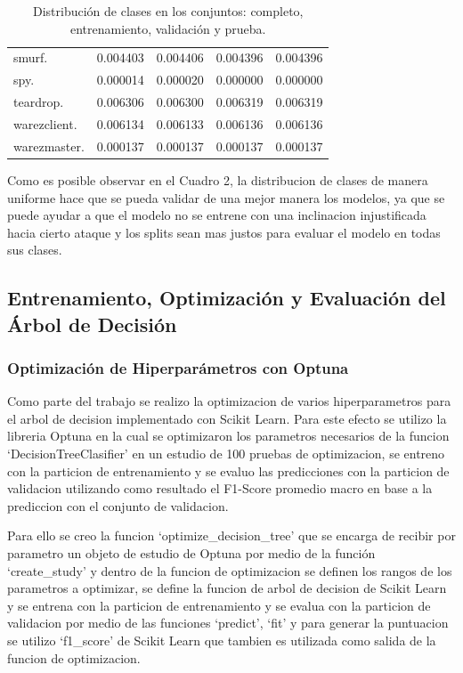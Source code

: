 \documentclass[12pt,a4paper]{article}
\begin{document}
\begin{table}[h!]
{\begin{tabular}{lrrrr}
      smurf.            & 0.004403 & 0.004406 & 0.004396 & 0.004396 \\
      spy.              & 0.000014 & 0.000020 & 0.000000 & 0.000000 \\
      teardrop.         & 0.006306 & 0.006300 & 0.006319 & 0.006319 \\
      warezclient.      & 0.006134 & 0.006133 & 0.006136 & 0.006136 \\
      warezmaster.      & 0.000137 & 0.000137 & 0.000137 & 0.000137 \\
      \hline
    \end{tabular}
  }
  \caption{Distribución de clases en los conjuntos: completo, entrenamiento, validación y prueba.}
  \label{tab:dist_all}
\end{table}

Como es posible observar en el Cuadro 2, la distribucion de clases de manera uniforme hace que se pueda
validar de una mejor manera los modelos, ya que se puede ayudar a que el modelo no se entrene
con una inclinacion injustificada hacia cierto ataque y los splits sean mas justos para evaluar el modelo en todas
sus clases.

\subsection{Entrenamiento, Optimización y Evaluación del Árbol de Decisión}

\subsubsection{Optimización de Hiperparámetros con Optuna}

Como parte del trabajo se realizo la optimizacion de varios hiperparametros para el arbol de decision implementado con Scikit Learn.
Para este efecto se utilizo la libreria Optuna en la cual se optimizaron los parametros necesarios de la funcion `DecisionTreeClasifier' en
un estudio de 100 pruebas de optimizacion, se entreno con la particion de entrenamiento y se evaluo las predicciones con la particion de validacion
utilizando como resultado el F1-Score promedio macro en base a la prediccion con el conjunto de validacion.

Para ello se creo la funcion `optimize_decision_tree' que se encarga de recibir por
parametro un objeto de estudio de Optuna por medio de la función `create_study' y dentro de la funcion
de optimizacion se definen los rangos de los parametros a optimizar,
se define la funcion de arbol de decision de Scikit Learn y se entrena
con la particion de entrenamiento y se evalua con la particion de validacion
por medio de las funciones `predict', `fit' y
para generar la puntuacion se utilizo `f1_score' de Scikit Learn que tambien
es utilizada como salida de la funcion de optimizacion.
\end{document}
